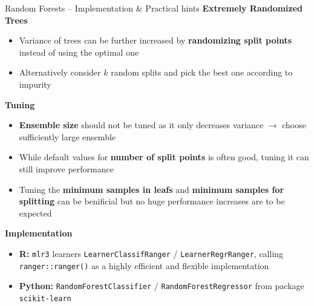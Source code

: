 \documentclass[11pt,compress,t,notes=noshow, xcolor=table]{beamer}
\newcommand{\highlight}[1]{\textcolor{hlcol}{\textbf{#1}}}
\begin{document}
\begin{vbframe}{Random Forests -- Implementation \& Practical hints}
  \highlight{Extremely Randomized Trees}
\begin{itemize}
    \item Variance of trees can be further increased by \textbf{randomizing split points} instead of using the optimal one
    \item Alternatively consider $k$ random splits and pick the best one according to impurity 
\end{itemize}

\medskip

\highlight{Tuning} 
\begin{itemize}
    \item \textbf{Ensemble size} should not be tuned as it only decreases variance $\longrightarrow$ choose sufficiently large ensemble
    \item While default values for \textbf{number of split points} is often good, tuning it can still improve performance
    \item Tuning the \textbf{minimum samples in leafs} and \textbf{minimum samples for splitting} can be benificial but no huge performance increases are to be expected 
\end{itemize}

\medskip

\highlight{Implementation}

\begin{itemize}
  \item \textbf{R:} \texttt{mlr3} learners \texttt{LearnerClassifRanger} / 
    \texttt{LearnerRegrRanger}, calling \texttt{ranger::ranger()} as a highly efficient and flexible implementation
  \item \textbf{Python:} \texttt{RandomForestClassifier} / 
  \texttt{RandomForestRegressor} from package \texttt{scikit-learn}
\end{itemize}
\end{vbframe}
\end{document}

